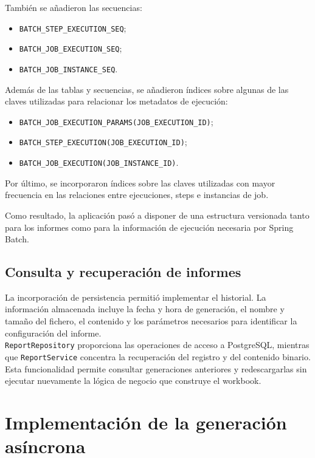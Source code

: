 \documentclass[11pt,a4paper,titlepage,oneside]{report}
\begin{document}
También se añadieron las secuencias:

\begin{itemize}
  \item \texttt{BATCH\_STEP\_EXECUTION\_SEQ};
  \item \texttt{BATCH\_JOB\_EXECUTION\_SEQ};
  \item \texttt{BATCH\_JOB\_INSTANCE\_SEQ}.
\end{itemize}

Además de las tablas y secuencias, se añadieron índices sobre algunas de las
claves utilizadas para relacionar los metadatos de ejecución:

\begin{itemize}
  \item \texttt{BATCH\_JOB\_EXECUTION\_PARAMS(JOB\_EXECUTION\_ID)};
  \item \texttt{BATCH\_STEP\_EXECUTION(JOB\_EXECUTION\_ID)};
  \item \texttt{BATCH\_JOB\_EXECUTION(JOB\_INSTANCE\_ID)}.
\end{itemize}

Por último, se incorporaron índices sobre las claves utilizadas con mayor
frecuencia en las relaciones entre ejecuciones, steps e instancias de job.

Como resultado, la aplicación pasó a disponer de una estructura versionada
tanto para los informes como para la información de ejecución necesaria por
Spring Batch.

\subsection{Consulta y recuperación de informes}

La incorporación de persistencia permitió implementar el historial. La
información almacenada incluye la fecha y hora de generación, el nombre y
tamaño del fichero, el contenido y los parámetros necesarios para identificar
la configuración del informe. \\

\texttt{ReportRepository} proporciona las operaciones de acceso a PostgreSQL,
mientras que \texttt{ReportService} concentra la recuperación del registro y
del contenido binario. Esta funcionalidad permite consultar generaciones
anteriores y redescargarlas sin ejecutar nuevamente la lógica de negocio que
construye el workbook. 

\section{Implementación de la generación asíncrona}
\end{document}
